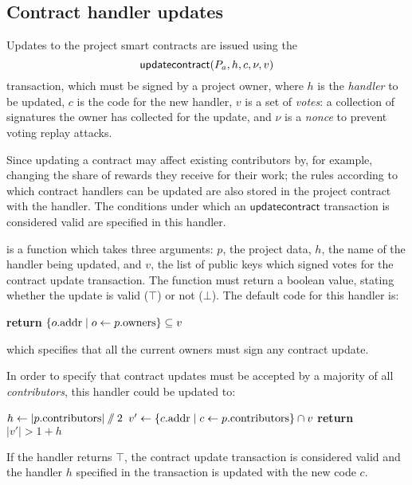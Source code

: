 
\subsection{Contract handler updates}

Updates to the project smart contracts are issued using the
\[
    \mathsf{updatecontract}\lparen P_a, h, c, \nu, v\rparen
\]
transaction, which must be signed by a project owner, where $h$ is the
\emph{handler} to be updated, $c$ is the code for the new handler, $v$ is a set
of \emph{votes}: a collection of signatures the owner has collected for the
update, and $\nu$ is a \emph{nonce} to prevent voting replay attacks.

Since updating a contract may affect existing contributors by, for example,
changing the share of rewards they receive for their work; the rules according
to which contract handlers can be updated are also stored in the project contract
with the  handler. The
conditions under which an $\mathsf{updatecontract}$ transaction is considered
valid are specified in this handler.

 is a function which takes three arguments: $p$,
the project data, $h$, the name of the handler being updated, and $v$, the list
of public keys which signed votes for the contract update transaction. The
function must return a boolean value, stating whether the update is valid ($\top$)
or not ($\bot$). The default code for this handler is:
\columnbreak
\begin{algorithmic}[0]
        \State \textbf{return} $\{ o.{\mathrm{addr}} \mid o \gets p.{\mathrm{owners}} \} \subseteq v$
    \EndProcedure
\end{algorithmic}
which specifies that all the current owners must sign any contract update.


In order to specify that contract updates must be accepted by a majority of all
\emph{contributors}, this handler could be updated to:
\medskip
\begin{algorithmic}[0]
        \State $h \gets |p.{\mathrm{contributors}}| \sslash 2$
        \State $v' \gets \{ c.{\mathrm{addr}} \mid c \gets p.{\mathrm{contributors}} \} \cap v$
        \State \textbf{return} $|v'| > 1 + h$
    \EndProcedure
\end{algorithmic}
If the handler returns $\top$, the contract update transaction is considered
valid and the handler $h$ specified in the transaction is updated with the new code
$c$.

